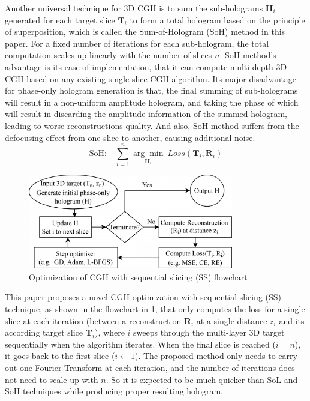 Another universal technique for 3D CGH is to sum the sub-holograms $\textbf{H}_i$ generated for each target slice $\textbf{T}_i$ to form a total hologram based on the principle of superposition, which is called the Sum-of-Hologram (SoH) method in this paper. For a fixed number of iterations for each sub-hologram, the total computation scales up linearly with the number of slices $n$. SoH method's advantage is its ease of implementation, that it can compute multi-depth 3D CGH based on any existing single slice CGH algorithm. Its major disadvantage for phase-only hologram generation is that, the final summing of sub-holograms will result in a non-uniform amplitude hologram, and taking the phase of which will result in discarding the amplitude information of the summed hologram, leading to worse reconstructions quality. And also, SoH method suffers from the defocusing effect from one slice to another, causing additional noise.
\begin{equation}
	\text{SoH:}\quad \sum_{i = 1}^{n} \underset{\textbf{H}_i}{\arg \min}\ Loss(\textbf{T}_i, \textbf{R}_i)
\end{equation}

\begin{figure}[h!]
	\centering
	\includegraphics[width=0.8\textwidth]{optim3d-cgh-flowchart}
	\caption{Optimization of CGH with sequential slicing (SS) flowchart}
	\label{fig:optim3d-cgh-flowchart}
\end{figure}

This paper proposes a novel CGH optimization with sequential slicing (SS) technique, as shown in the flowchart in \cref{fig:optim3d-cgh-flowchart}, that only computes the loss for a single slice at each iteration (between a reconstruction $\textbf{R}_i$ at a single distance $z_i$ and its according target slice $\textbf{T}_i$), where $i$ sweeps through the multi-layer 3D target sequentially when the algorithm iterates. When the final slice is reached ($i=n$), it goes back to the first slice ($i \gets 1$). The proposed method only needs to carry out one Fourier Transform at each iteration, and the number of iterations does not need to scale up with $n$. So it is expected to be much quicker than SoL and SoH techniques while producing proper resulting hologram.










